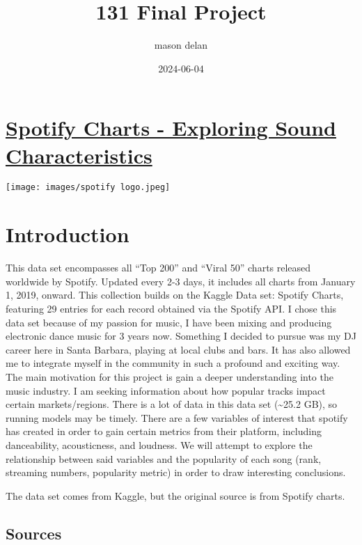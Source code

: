 \documentclass[
]{article}
\title{131 Final Project}
\author{mason delan}
\date{2024-06-04}
\begin{document}
\maketitle

\hypertarget{spotify-charts---exploring-sound-characteristics}{%
\section{\texorpdfstring{\ul{Spotify Charts - Exploring Sound
Characteristics}}{Spotify Charts - Exploring Sound Characteristics}}\label{spotify-charts---exploring-sound-characteristics}}

\texttt{[image: images/spotify logo.jpeg]}

\hypertarget{introduction}{%
\section{\texorpdfstring{\textbf{Introduction}}{Introduction}}\label{introduction}}

This data set encompasses all ``Top 200'' and ``Viral 50'' charts
released worldwide by Spotify. Updated every 2-3 days, it includes all
charts from January 1, 2019, onward. This collection builds on the
Kaggle Data set: Spotify Charts, featuring 29 entries for each record
obtained via the Spotify API. I chose this data set because of my
passion for music, I have been mixing and producing electronic dance
music for 3 years now. Something I decided to pursue was my DJ career
here in Santa Barbara, playing at local clubs and bars. It has also
allowed me to integrate myself in the community in such a profound and
exciting way. The main motivation for this project is gain a deeper
understanding into the music industry. I am seeking information about
how popular tracks impact certain markets/regions. There is a lot of
data in this data set (\textasciitilde25.2 GB), so running models may be
timely. There are a few variables of interest that spotify has created
in order to gain certain metrics from their platform, including
danceability, acousticness, and loudness. We will attempt to explore the
relationship between said variables and the popularity of each song
(rank, streaming numbers, popularity metric) in order to draw
interesting conclusions.

The data set comes from Kaggle, but the original source is from Spotify
charts.

\hypertarget{sources}{%
\subsection{\texorpdfstring{\textbf{Sources}}{Sources}}\label{sources}}
\end{document}
